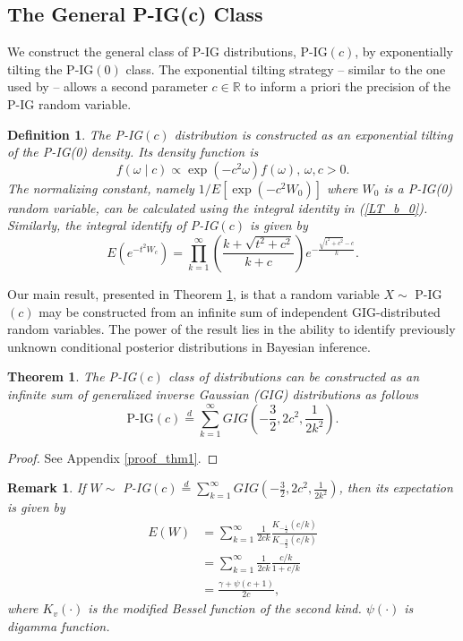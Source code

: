 \documentclass{statsoc}
\newtheorem{theorem}{Theorem}
\newtheorem{definition}{Definition}
\newtheorem{remark}{Remark}
\begin{document}
\subsection{The General P-IG(c) Class}
\label{subsec:PIG_dc}
We construct the general class of P-IG distributions, P-IG$\left(c\right)$, by exponentially tilting the P-IG$(0)$ class.  The exponential tilting strategy -- similar to the one used by \citet{polson2013bayesian} -- allows a second parameter $c \in \mathbb{R}$ to inform a priori the precision of the P-IG random variable.        
\begin{definition}
\label{def:PG_dc}
The P-IG$(c)$ distribution is constructed as an exponential tilting of the P-IG(0) density. Its density function is
\begin{equation}
f\left(\omega \mid c\right) \propto \exp\left(- c^2 \omega\right) f(\omega),\, \omega,c >0.
\end{equation}
The normalizing constant, namely $1/E\left[\exp\left(-c^2 W_0\right)\right]$ where $W_0$ is a P-IG(0) random variable, can be calculated using the integral identity in (\ref{LT_b_0}). Similarly, the integral identify of P-IG$(c)$ is given by
\begin{equation}
E(e^{-t^2 W_c}) = \prod_{k=1}^\infty \left( \frac{k + \sqrt{t^2 + c^2}}{k + c} \right) e^{-\frac{\sqrt{t^2 + c^2}-c}{k}}.
\end{equation}
\end{definition}

Our main result, presented in Theorem \ref{thm:theorem_1}, is that a random variable $X\sim$ P-IG$(c)$ may be constructed from an infinite sum of independent GIG-distributed random variables.  The power of the result lies in the ability to identify previously unknown conditional posterior distributions in Bayesian inference. 

\begin{theorem}
\label{thm:theorem_1}
The P-IG$(c)$ class of distributions can be constructed as an infinite sum of generalized inverse Gaussian (GIG) distributions as follows
$$
\mbox{P-IG}(c) \overset{d}{=} \sum_{k=1}^\infty GIG\left(-\frac{3}{2}, 2c^2, \frac{1}{2k^2}\right).
$$
\end{theorem}
\begin{proof}
See Appendix \ref{proof_thm1}.
\end{proof}


\begin{remark}
If $W\sim$ P-IG$(c) \overset{d}{=} \sum_{k=1}^\infty GIG\left(-\frac{3}{2}, 2c^2, \frac{1}{2k^2}\right)$, then its expectation is given by
\begin{align*}
E(W) &= \sum_{k=1}^\infty \frac{1}{2ck}\frac{K_{-\frac{1}{2}}(c/k)}{K_{-\frac{3}{2}}(c/k)}\\
&= \sum_{k=1}^\infty \frac{1}{2ck} \frac{c/k}{1 + c/k} \\
&= \frac{\gamma + \psi(c + 1)}{2c},
\end{align*}
where $K_v(\cdot)$ is the modified Bessel function of the second kind. $\psi(\cdot)$ is digamma function.
\end{remark}
\end{document}
